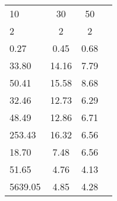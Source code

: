 \begin{tabular}{l|c|c|c|}
\toprule
      10 &     30 &    50 \\
       2 &      2 &     2 \\
\midrule
    0.27 &   0.45 &  0.68 \\
   33.80 &  14.16 &  7.79 \\
   50.41 &  15.58 &  8.68 \\
   \cellcolor{\secondcolor}32.46 &  12.73 &  6.29 \\
   48.49 &  12.86 &  6.71 \\
  253.43 &  16.32 &  6.56 \\
   \cellcolor{\firstcolor}18.70 &   7.48 &  6.56 \\
   51.65 &   \cellcolor{\firstcolor}4.76 &  \cellcolor{\firstcolor}4.13 \\
 5639.05 &   \cellcolor{\secondcolor}4.85 &  \cellcolor{\secondcolor}4.28 \\
\bottomrule
\end{tabular}
